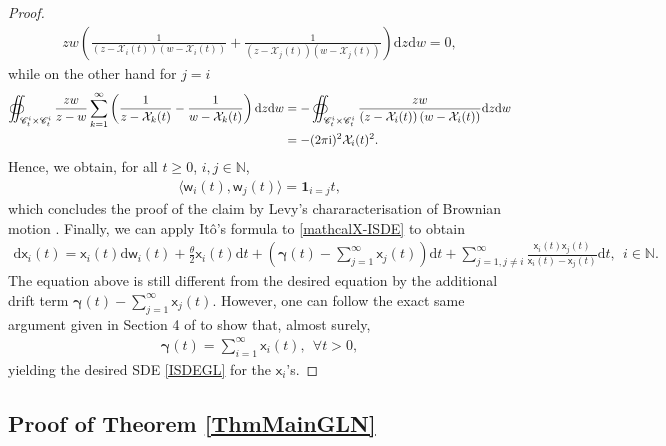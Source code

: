 \documentclass[]{article}
\begin{document}
\begin{proof}
\begin{align*}
    zw
    \left(
    \frac{1}{\left(z-\mathcal{X}_i(t)\right)\left(w-\mathcal{X}_i(t)\right)}
    +
   \frac{1}{\left(z-\mathcal{X}_j(t)\right)\left(w-\mathcal{X}_j(t)\right)}
    \right)
    \mathrm{d}z\mathrm{d}w=0,
\end{align*}
while on the other hand for $j=i$
\begin{align*}
\oiint_{\mathscr{C}_t^i
    \times 
    \mathscr{C}_t^i}
    \frac{zw}{z-w}
    \sum_{k=1}^\infty
    \left(
    \frac{1}{z-\mathcal{X}_k(t)}
    -
    \frac{1}{w-\mathcal{X}_k(t)}
    \right)
    \mathrm{d}z\mathrm{d}w
     &=
     -
\oiint_{\mathscr{C}_t^i
    \times 
    \mathscr{C}_t^i}
    \frac{zw}{\left(z-\mathcal{X}_i(t)\right)\left(w-\mathcal{X}_i(t)\right)}\mathrm{d}z\mathrm{d}w
    \\
    &=-(2\pi\textnormal{i})^2
    \mathcal{X}_i(t)^2.
\end{align*}
Hence, we obtain, for all $t\ge 0$, $i,j \in \mathbb{N}$,
\begin{align*}
    \langle
   \mathsf{w}_i(t),
    \mathsf{w}_j(t)
    \rangle=\mathbf{1}_{i=j}t,
\end{align*}
which concludes the proof of the claim by Levy's chararacterisation of Brownian motion \cite{Kallenberg}. Finally,  we can apply It\^{o}'s  formula to \eqref{mathcalX-ISDE} to obtain 
\begin{align}\label{PenultimateGLisde}
     \mathrm{d}\mathsf{x}_i(t)= \mathsf{x}_i(t)\mathrm{d}\mathsf{w}_i(t) + \frac{\theta}{2}\mathsf{x}_i(t)\mathrm{d}t
 +
 \left(\boldsymbol{\gamma}(t)-\sum_{j=1}^\infty\mathsf{x}_j(t) \right)\mathrm{d}t
 +\sum_{j=1,j\neq i}^{\infty}\frac{\mathsf{x}_i(t)\mathsf{x}_j(t)}{\mathsf{x}_i(t)-\mathsf{x}_j(t)}\mathrm{d}t, \  \ i\in\mathbb{N}.
\end{align}
The equation above is still different from the desired equation 
    by the additional drift term
    $ \boldsymbol{\gamma}(t)-\sum_{j=1}^{\infty}\mathsf{x}_j(t)$. However, one can follow the exact same argument given in Section 4 of \cite{AM24}  to show that, almost surely,
 \begin{align*}
\boldsymbol{\gamma}(t)=\sum_{i=1}^{\infty}\mathsf{x}_i(t), \ \  \forall t>0,
 \end{align*}
 yielding the desired SDE \eqref{ISDEGL} for the $\mathsf{x}_i$'s.
\end{proof}


\subsection{Proof of Theorem \ref{ThmMainGLN}}
\end{document}
